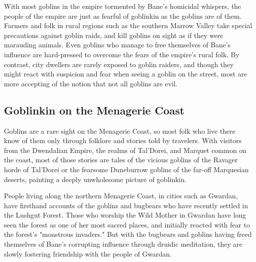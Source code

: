 \documentclass[10pt,a4paper,twoside,bg=print,twocolumn,openany,nodeprecatedcode]{dndbook}
\begin{document}
With most goblins in the empire tormented by Bane's homicidal whispers, the people of the empire are just as fearful of goblinkin as the goblins are of them. Farmers and folk in rural regions such as the southern Marrow Valley take special precautions against goblin raids, and kill goblins on sight as if they were marauding animals. Even goblins who manage to free themselves of Bane's influence are hard-pressed to overcome the fears of the empire's rural folk. By contrast, city dwellers are rarely exposed to goblin raiders, and though they might react with suspicion and fear when seeing a goblin on the street, most are more accepting of the notion that not all goblins are evil.

\subsection{Goblinkin on the Menagerie Coast}
Goblins are a rare sight on the Menagerie Coast, so most folk who live there know of them only through folklore and stories told by travelers. With visitors from the Dwendalian Empire, the realms of Tal'Dorei, and Marquet common on the coast, most of those stories are tales of the vicious goblins of the Ravager horde of Tal'Dorei or the fearsome Duneburrow goblins of the far-off Marquesian deserts, painting a deeply unwholesome picture of goblinkin.

People living along the northern Menagerie Coast, in cities such as Gwardan, have firsthand accounts of the goblins and bugbears who have recently settled in the Lushgut Forest. Those who worship the Wild Mother in Gwardan have long seen the forest as one of her most sacred places, and initially reacted with fear to the forest's "monstrous invaders." But with the bugbears and goblins having freed themselves of Bane's corrupting influence through druidic meditation, they are slowly fostering friendship with the people of Gwardan.
\end{document}
